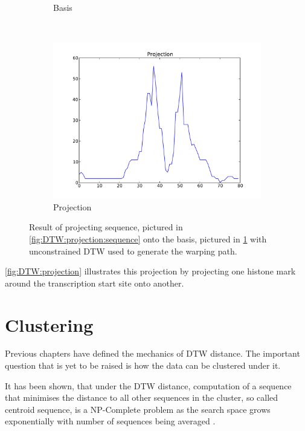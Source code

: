 \documentclass[parskip]{cs4rep}
\begin{document}
\begin{figure}[t,b]
\begin{subfigure}[b]{0.31\textwidth}
       \caption{Basis}
       \label{fig:DTW:projection:basis}
   \end{subfigure}
   ~
   \begin{subfigure}[b]{0.31\textwidth}
       \centering
       \includegraphics[width=\textwidth]{figures/DTW/projection.pdf}
       \caption{Projection}
       \label{fig:DTW:projection:projection}
   \end{subfigure}
   \caption{Result of projecting sequence, pictured in \ref{fig:DTW:projection:sequence} onto the basis, pictured in \ref{fig:DTW:projection:basis} with unconstrained DTW used to generate the warping path.}
   \label{fig:DTW:projection}
\end{figure}

\autoref{fig:DTW:projection} illustrates this projection by projecting one histone mark around the transcription start site onto another.


\section{Clustering}
\label{sec:clustering}

Previous chapters have defined the mechanics of DTW distance. The important question that is yet to be raised is how the data can be clustered under it. 

It has been shown, that under the DTW distance, computation of a sequence that minimises the distance to all other sequences in the cluster, so called centroid sequence, is a NP-Complete problem as the search space grows exponentially with number of sequences being averaged \cite{Hautamaki:2008fh,Petitjean:2012bp}.
\end{document}
